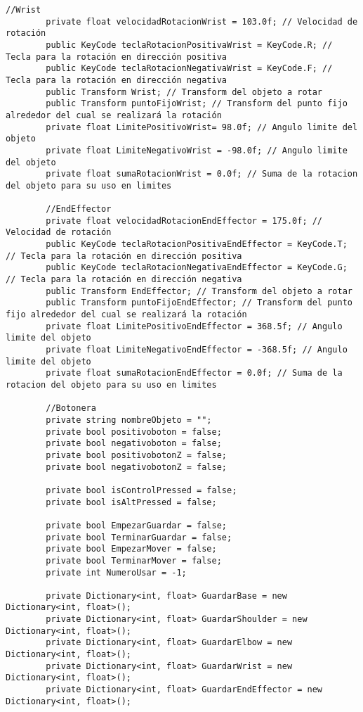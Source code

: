 \begin{lstlisting}[frame=single]
        //Wrist
        private float velocidadRotacionWrist = 103.0f; // Velocidad de rotación
        public KeyCode teclaRotacionPositivaWrist = KeyCode.R; // Tecla para la rotación en dirección positiva
        public KeyCode teclaRotacionNegativaWrist = KeyCode.F; // Tecla para la rotación en dirección negativa
        public Transform Wrist; // Transform del objeto a rotar
        public Transform puntoFijoWrist; // Transform del punto fijo alrededor del cual se realizará la rotación
        private float LimitePositivoWrist= 98.0f; // Angulo limite del objeto
        private float LimiteNegativoWrist = -98.0f; // Angulo limite del objeto
        private float sumaRotacionWrist = 0.0f; // Suma de la rotacion del objeto para su uso en limites
    
        //EndEffector
        private float velocidadRotacionEndEffector = 175.0f; // Velocidad de rotación
        public KeyCode teclaRotacionPositivaEndEffector = KeyCode.T; // Tecla para la rotación en dirección positiva
        public KeyCode teclaRotacionNegativaEndEffector = KeyCode.G; // Tecla para la rotación en dirección negativa
        public Transform EndEffector; // Transform del objeto a rotar
        public Transform puntoFijoEndEffector; // Transform del punto fijo alrededor del cual se realizará la rotación
        private float LimitePositivoEndEffector = 368.5f; // Angulo limite del objeto
        private float LimiteNegativoEndEffector = -368.5f; // Angulo limite del objeto
        private float sumaRotacionEndEffector = 0.0f; // Suma de la rotacion del objeto para su uso en limites
    
        //Botonera
        private string nombreObjeto = "";
        private bool positivoboton = false;
        private bool negativoboton = false;
        private bool positivobotonZ = false;
        private bool negativobotonZ = false;
    
        private bool isControlPressed = false;
        private bool isAltPressed = false;
    
        private bool EmpezarGuardar = false;
        private bool TerminarGuardar = false;
        private bool EmpezarMover = false;
        private bool TerminarMover = false;
        private int NumeroUsar = -1;
    
        private Dictionary<int, float> GuardarBase = new Dictionary<int, float>();
        private Dictionary<int, float> GuardarShoulder = new Dictionary<int, float>();
        private Dictionary<int, float> GuardarElbow = new Dictionary<int, float>();
        private Dictionary<int, float> GuardarWrist = new Dictionary<int, float>();
        private Dictionary<int, float> GuardarEndEffector = new Dictionary<int, float>();
    

\end{lstlisting}
